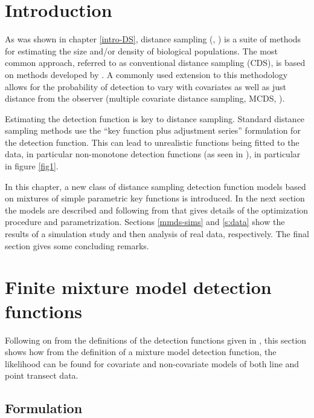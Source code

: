 \label{chap-mmds}

\section{Introduction}
\label{s:intro}

 As was shown in chapter \ref{intro-DS}, distance sampling (\cite{IDS}, \cite{ADS}) is a suite of methods for estimating the size and/or density of biological populations. The most common approach, referred to as conventional distance sampling (CDS), is based on methods developed by . A commonly used extension to this methodology allows for the probability of detection to vary with covariates as well as just distance from the observer (multiple covariate distance sampling, MCDS, \cite[chapter 3]{ADS}).

Estimating the detection function is key to distance sampling. Standard distance sampling methods use the ``key function plus adjustment series'' formulation for the detection function. This can lead to unrealistic functions being fitted to the data\label{cor-8s1}, in particular non-monotone detection functions (as seen in ), in particular in figure \ref{fig1}.

In this chapter, a new class of distance sampling detection function models based on mixtures of simple parametric key functions is introduced. In the next section the models are described and following from that  gives details of the optimization procedure and parametrization. Sections \ref{mmds-sims} and \ref{s:data} show the results of a simulation study and then analysis of real data, respectively. The final section gives some concluding remarks.

\section{Finite mixture model detection functions}

Following on from the definitions of the detection functions given in \label{cor-8s2}, this section shows how from the definition of a mixture model detection function, the likelihood can be found for covariate and non-covariate models of both line and point transect data.

\subsection{Formulation}
\label{s:detfcts}

